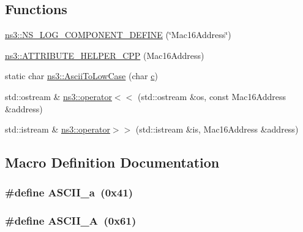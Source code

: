 \subsection*{Functions}
\begin{DoxyCompactItemize}
\item 
\hyperlink{namespacens3_ad54e413e38ac71396b0a33a73a7dd87f}{ns3\+::\+N\+S\+\_\+\+L\+O\+G\+\_\+\+C\+O\+M\+P\+O\+N\+E\+N\+T\+\_\+\+D\+E\+F\+I\+NE} (\char`\"{}Mac16\+Address\char`\"{})
\item 
\hyperlink{namespacens3_a100e0de89b9472b320940cf8b727ff3e}{ns3\+::\+A\+T\+T\+R\+I\+B\+U\+T\+E\+\_\+\+H\+E\+L\+P\+E\+R\+\_\+\+C\+PP} (Mac16\+Address)
\item 
static char \hyperlink{namespacens3_ae7934c60f6570d35f78e1b99577351a0}{ns3\+::\+Ascii\+To\+Low\+Case} (char \hyperlink{mmwave_2model_2fading-traces_2fading__trace__generator_8m_ae0323a9039add2978bf5b49550572c7c}{c})
\item 
std\+::ostream \& \hyperlink{namespacens3_a588376fa9b92fceb93a3ec4cdffc8cd7}{ns3\+::operator$<$$<$} (std\+::ostream \&os, const Mac16\+Address \&address)
\item 
std\+::istream \& \hyperlink{namespacens3_a088bcc69d13c65e904b4c3aded24f774}{ns3\+::operator$>$$>$} (std\+::istream \&is, Mac16\+Address \&address)
\end{DoxyCompactItemize}


\subsection{Macro Definition Documentation}
\subsubsection[{\texorpdfstring{A\+S\+C\+I\+I\+\_\+a}{ASCII_a}}]{\setlength{\rightskip}{0pt plus 5cm}\#define A\+S\+C\+I\+I\+\_\+a~(0x41)}\hypertarget{mac16-address_8cc_acb0c7653dabe53da8a7fb03bcad505e7}{}\label{mac16-address_8cc_acb0c7653dabe53da8a7fb03bcad505e7}
\subsubsection[{\texorpdfstring{A\+S\+C\+I\+I\+\_\+A}{ASCII_A}}]{\setlength{\rightskip}{0pt plus 5cm}\#define A\+S\+C\+I\+I\+\_\+A~(0x61)}\hypertarget{mac16-address_8cc_a6ccdee41712ed103021e82cb944f47e6}{}\label{mac16-address_8cc_a6ccdee41712ed103021e82cb944f47e6}
